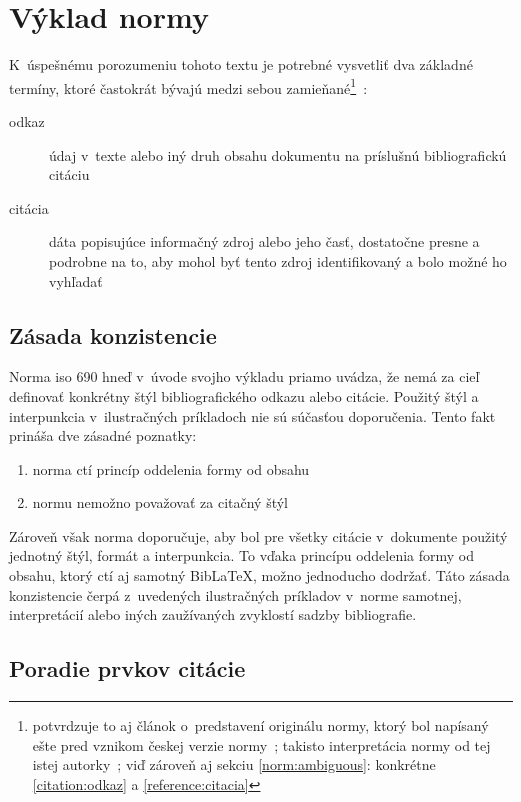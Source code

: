 \documentclass[
  color,
  table,
  nolof,
  oneside,
]{fithesis3}
\begin{document}
\section{Výklad normy}

K~úspešnému porozumeniu tohoto textu je potrebné vysvetliť dva základné termíny, ktoré častokrát bývajú medzi sebou zamieňané\footnote{potvrdzuje to aj článok o~predstavení originálu normy, ktorý bol napísaný ešte pred vznikom českej verzie normy~\cite{Bratkova2010}; takisto interpretácia normy od tej istej autorky~\cite{Bratkova2011}; viď zároveň aj sekciu \ref{norm:ambiguous}: konkrétne \ref{citation:odkaz} a \ref{reference:citacia}}~\cite{csn:iso690:2011}:

\begin{description}
\item[odkaz] údaj v~texte alebo iný druh obsahu dokumentu na príslušnú bibliografickú citáciu
\item[citácia] dáta popisujúce informačný zdroj alebo jeho časť, dostatočne presne a podrobne na to, aby mohol byť tento zdroj identifikovaný a bolo možné ho vyhľadať
\end{description}

\subsection{Zásada konzistencie}\label{norm:consistency}

Norma \gls{iso} 690 hneď v~úvode svojho výkladu priamo uvádza, že nemá za cieľ definovať konkrétny štýl bibliografického odkazu alebo citácie. Použitý štýl a interpunkcia v~ilustračných príkladoch nie sú súčasťou doporučenia. Tento fakt prináša dve zásadné poznatky:

\begin{enumerate}
\item norma ctí princíp oddelenia formy od obsahu
\item normu nemožno považovať za citačný štýl~\cite{Hala2013}
\end{enumerate}

Zároveň však norma doporučuje, aby bol pre všetky citácie v~dokumente použitý jednotný štýl, formát a interpunkcia. To vďaka princípu oddelenia formy od obsahu, ktorý ctí aj samotný BibLaTeX, možno jednoducho dodržať. Táto zásada konzistencie čerpá z~uvedených ilustračných príkladov v~norme samotnej, interpretácií alebo iných zaužívaných zvyklostí sadzby bibliografie.

\subsection{Poradie prvkov citácie}
\end{document}
